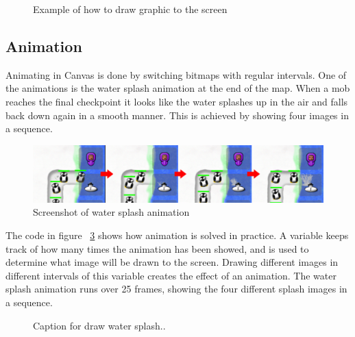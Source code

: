 \begin{figure}[htb]

\begin{small}

\end{small}

\caption{Example of how to draw graphic to the screen}
\label{fig:codeExDrawMoney}
\end{figure}

\subsection{Animation}

Animating in Canvas is done by switching bitmaps with regular intervals. One of the animations is the water splash animation at the end of the map. When a mob reaches the final checkpoint it looks like the water splashes up in the air and falls back down again in a smooth manner. This is achieved by showing four images in a sequence. 

\begin{figure}[here]
\begin{center}
\includegraphics[scale=0.6]{pics/chapters/chapter4/splash2}
\end{center}
\caption{Screenshot of water splash animation}
\label{fig:waterSplashAnimation}
\end{figure}

The code in figure ~\ref{fig:codeExDrawWaterSplash} shows how animation is solved in practice. A variable keeps track of how many times the animation has been showed, and is used to determine what image will be drawn to the screen. Drawing different images in different intervals of this variable creates the effect of an animation. The water splash animation runs over 25 frames, showing the four different splash images in a sequence. 

\begin{figure}[htb]

\begin{small}

\end{small}

\caption{Caption for draw water splash..}
\label{fig:codeExDrawWaterSplash}
\end{figure}

